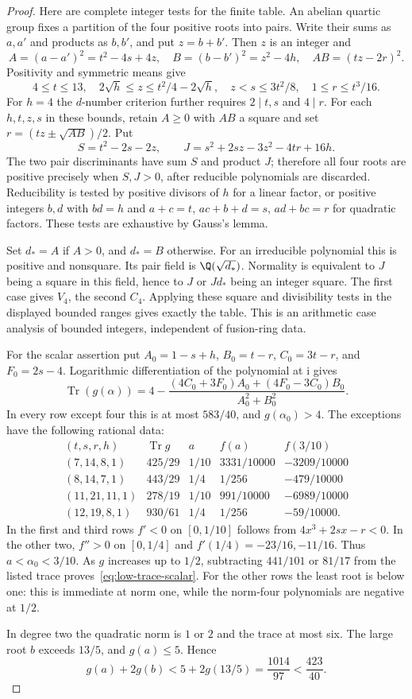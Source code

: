 \begin{proof}
Here are complete integer tests for the finite table. An abelian
quartic group fixes a partition of the four positive roots into pairs.
Write their sums as $a,a'$ and products as $b,b'$, and put $z=b+b'$.
Then $z$ is an integer and
\[
 A=(a-a')^2=t^2-4s+4z,\quad B=(b-b')^2=z^2-4h,\quad
 AB=(tz-2r)^2.
\]
Positivity and symmetric means give
\[
 4\le t\le13,\quad 2\sqrt h\le z\le t^2/4-2\sqrt h,
 \quad z<s\le3t^2/8,\quad 1\le r\le t^3/16.
\]
For $h=4$ the $d$-number criterion further requires $2\mid t,s$ and
$4\mid r$. For each $h,t,z,s$ in these bounds, retain $A\ge0$ with
$AB$ a square and set $r=(tz\pm\sqrt{AB})/2$.
Put
\[
 S=t^2-2s-2z,\qquad J=s^2+2sz-3z^2-4tr+16h.
\]
The two pair discriminants have sum $S$ and product $J$; therefore
all four roots are positive precisely when $S,J>0$, after reducible
polynomials are discarded. Reducibility is tested by positive divisors
of $h$ for a linear factor, or positive integers $b,d$ with $bd=h$ and
$a+c=t$, $ac+b+d=s$, $ad+bc=r$ for quadratic factors.
These tests are exhaustive by Gauss's lemma.

Set $d_*=A$ if $A>0$, and $d_*=B$ otherwise. For an irreducible
polynomial this is positive and nonsquare. Its pair field is
$\Q(\sqrt{d_*})$. Normality is equivalent to $J$ being a square
in this field, hence to $J$ or $Jd_*$ being an integer square. The first
case gives $V_4$, the second $C_4$. Applying these square and divisibility
tests in the displayed bounded ranges gives exactly the table.
This is an arithmetic case analysis of bounded integers, independent
of fusion-ring data.

For the scalar assertion put $A_0=1-s+h$, $B_0=t-r$,
$C_0=3t-r$, and $F_0=2s-4$. Logarithmic differentiation of the
polynomial at $\mathrm i$ gives
\[
 \operatorname{Tr}(g(\alpha))=
 4-\frac{(4C_0+3F_0)A_0+(4F_0-3C_0)B_0}{A_0^2+B_0^2}.
\]
In every row except four this is at most $583/40$, and
$g(\alpha_0)>4$. The exceptions have the following rational data:
\[
\begin{array}{c|c|c|c|c}
(t,s,r,h)&\operatorname{Tr}g&a&f(a)&f(3/10)\\\hline
(7,14,8,1)&425/29&1/10&3331/10000&-3209/10000\\
(8,14,7,1)&443/29&1/4&1/256&-479/10000\\
(11,21,11,1)&278/19&1/10&991/10000&-6989/10000\\
(12,19,8,1)&930/61&1/4&1/256&-59/10000.
\end{array}
\]
In the first and third rows $f'<0$ on $[0,1/10]$ follows from
$4x^3+2sx-r<0$. In the other two, $f''>0$ on $[0,1/4]$ and
$f'(1/4)=-23/16,-11/16$. Thus $a<\alpha_0<3/10$.
As $g$ increases up to $1/2$, subtracting $441/101$ or $81/17$
from the listed trace proves~\eqref{eq:low-trace-scalar}.
For the other rows the least root is below one: this is immediate at
norm one, while the norm-four polynomials are negative at $1/2$.

In degree two the quadratic norm is $1$ or $2$ and the trace at most
six. The large root $b$ exceeds $13/5$, and $g(a)\le5$. Hence
\[
 g(a)+2g(b)<5+2g(13/5)=\frac{1014}{97}<\frac{423}{40}.
\]
\end{proof}



